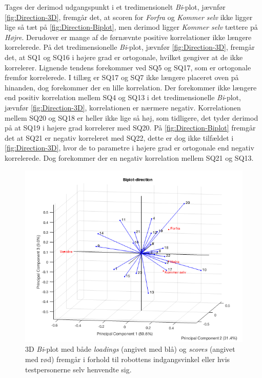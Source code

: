 \noindent
%
Tages der derimod udgangspunkt i et tredimensionelt \textit{Bi}-plot, jævnfør \autoref{fig:Direction-3D}, fremgår det, at scoren for \textit{Forfra} og \textit{Kommer selv} ikke ligger lige så tæt på \autoref{fig:Direction-Biplot}, men derimod ligger \textit{Kommer selv} tættere på \textit{Højre}. Derudover er mange af de førnævnte positive korrelationer ikke længere korrelerede. På det tredimensionelle \textit{Bi}-plot, jævnfør \autoref{fig:Direction-3D}, fremgår det, at SQ1 og SQ16 i højere grad er ortogonale, hvilket gengiver at de ikke korrelerer. Lignende tendens forekommer ved SQ5 og SQ17, som er ortogonale fremfor korrelerede. I tillæg er SQ17 og SQ7 ikke længere placeret oven på hinanden, dog forekommer der en lille korrelation. Der forekommer ikke længere end positiv korrelation mellem SQ4 og SQ13 i det tredimensionelle \textit{Bi}-plot, jævnfør \autoref{fig:Direction-3D}, korrelationen er nærmere negativ. Korrelationen mellem SQ20 og SQ18 er heller ikke lige så høj, som tidligere, det tyder derimod på at SQ19 i højere grad korrelerer med SQ20. På \autoref{fig:Direction-Biplot} fremgår det at SQ21 er negativ korreleret med SQ22, dette er dog ikke tilfældet i \autoref{fig:Direction-3D}, hvor de to parametre i højere grad er ortogonale end negativ korrelerede. Dog forekommer der en negativ korrelation mellem SQ21 og SQ13.
%
\begin{figure}[H]
\centering
\includegraphics[width=\textwidth]{Figure/DatabehandlingSkalaer/PCAfigures/Direction-3D.png}
\caption{3D \textit{Bi}-plot med både \textit{loadings} (angivet med blå) og \textit{scores} (angivet med rød) fremgår i forhold til robottens indgangsvinkel eller hvis testpersonerne selv henvendte sig.}
\label{fig:Direction-3D}
\end{figure}
%


